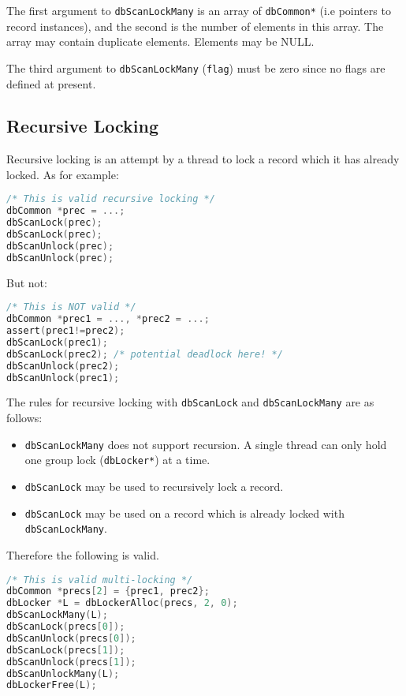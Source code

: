 The first argument to \verb|dbScanLockMany| is an array of \verb|dbCommon*|
(i.e pointers to record instances), and the second is the number of elements in this array.
The array may contain duplicate elements.
Elements may be NULL.

The third argument to \verb|dbScanLockMany| (\verb|flag|) must be zero since no flags are defined at present.

\subsection{Recursive Locking}
\label{sec:recursivelocking}

Recursive locking is an attempt by a thread to lock a record which it has already locked.
As for example:

\begin{lstlisting}[language=C]
/* This is valid recursive locking */
dbCommon *prec = ...;
dbScanLock(prec);
dbScanLock(prec);
dbScanUnlock(prec);
dbScanUnlock(prec);
\end{lstlisting}

But not:

\begin{lstlisting}[language=C]
/* This is NOT valid */
dbCommon *prec1 = ..., *prec2 = ...;
assert(prec1!=prec2);
dbScanLock(prec1);
dbScanLock(prec2); /* potential deadlock here! */
dbScanUnlock(prec2);
dbScanUnlock(prec1);
\end{lstlisting}

The rules for recursive locking with \verb|dbScanLock| and \verb|dbScanLockMany| are as follows:

\begin{itemize}
\item \verb|dbScanLockMany| does not support recursion.
A single thread can only hold one group lock (\verb|dbLocker*|) at a time.
\item \verb|dbScanLock| may be used to recursively lock a record.
\item \verb|dbScanLock| may be used on a record which is already locked with \verb|dbScanLockMany|.
\end{itemize}

Therefore the following is valid.

\begin{lstlisting}[language=C]
/* This is valid multi-locking */
dbCommon *precs[2] = {prec1, prec2};
dbLocker *L = dbLockerAlloc(precs, 2, 0);
dbScanLockMany(L);
dbScanLock(precs[0]);
dbScanUnlock(precs[0]);
dbScanLock(precs[1]);
dbScanUnlock(precs[1]);
dbScanUnlockMany(L);
dbLockerFree(L);
\end{lstlisting}

